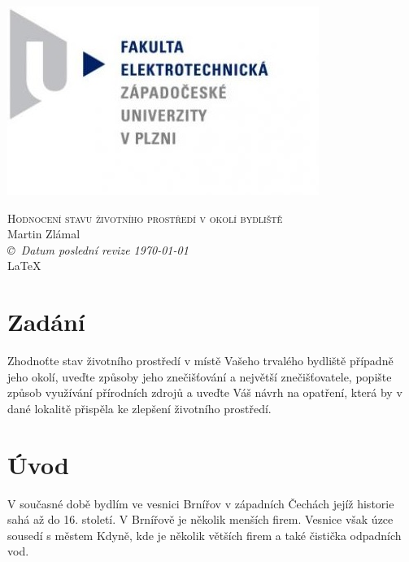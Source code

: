 \documentclass[12pt]{article} %
\newcommand{\bigsize}{\fontsize{35pt}{20pt}\selectfont}
\begin{document}
\begin{titlepage}
	\includegraphics[scale=0.7]{logo.jpg}
	\vspace*{\fill}
	\begin{center}
		\textsc{\LARGE \bigsize Hodnocení stavu životního prostředí v okolí bydliště}\\[1cm]
		Martin Zlámal \\[1cm]
		{\small\em \copyright \ Datum poslední revize \today } \\
		\LaTeX
	\end{center}
	\vspace*{\fill}
\end{titlepage}
\tableofcontents
\listoffigures
\listoftables
\newpage


\section{Zadání}
Zhodnoťte stav životního prostředí v místě Vašeho trvalého bydliště případně jeho okolí, uveďte způsoby jeho znečišťování a největší znečišťovatele, popište způsob využívání přírodních zdrojů a uveďte Váš návrh na opatření, která by v dané lokalitě přispěla ke zlepšení životního prostředí.

\section{Úvod}
V současné době bydlím ve vesnici Brnířov v západních Čechách jejíž historie sahá až do 16. století. V Brnířově je několik menších firem. Vesnice však úzce sousedí s městem Kdyně, kde je několik větších firem a také čistička odpadních vod.
\end{document}
